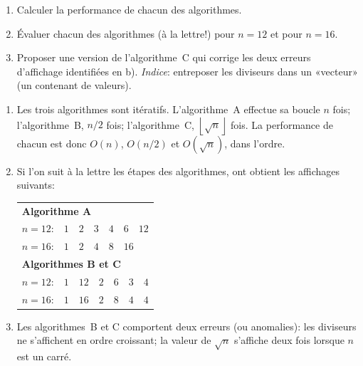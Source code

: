 \begin{exercice}
  \begin{enumerate}
  \item Calculer la performance de chacun des algorithmes.
  \item Évaluer chacun des algorithmes (à la lettre!) pour $n = 12$ et
    pour $n = 16$.
  \item Proposer une version de l'algorithme~C qui corrige les deux
    erreurs d'affichage identifiées en b). \emph{Indice}: entreposer
    les diviseurs dans un «vecteur» (un contenant de valeurs).
  \end{enumerate}
  \begin{sol}
    \begin{enumerate}
    \item Les trois algorithmes sont itératifs. L'algorithme~A
      effectue sa boucle $n$ fois; l'algorithme~B, $n/2$ fois;
      l'algorithme~C, $\left\lfloor \sqrt{n} \right\rfloor$ fois. La
      performance de chacun est donc $O(n)$, $O(n/2)$ et
      $O(\sqrt{n})$, dans l'ordre.
    \item Si l'on suit à la lettre les étapes des algorithmes, ont
      obtient les affichages suivants:
      \begin{center}
        \begin{tabular}{rl}
          \multicolumn{2}{l}{\textbf{Algorithme A}} \\
          $n = 12$: & $1\quad 2\quad 3\quad 4\quad 6\quad 12$ \\
          $n = 16$: & $1\quad 2\quad 4\quad 8\quad 16$ \\[6pt]
          \multicolumn{2}{l}{\textbf{Algorithmes B et C}} \\
          $n = 12$: & $1\quad 12\quad 2\quad 6\quad 3\quad 4$ \\
          $n = 16$: & $1\quad 16\quad 2\quad 8\quad 4\quad 4$ \\[6pt]
        \end{tabular}
      \end{center}
    \item Les algorithmes~B et C comportent deux erreurs (ou
      anomalies): les diviseurs ne s'affichent en ordre croissant; la
      valeur de $\sqrt{n}$ s'affiche deux fois lorsque $n$ est un
      carré.


\end{enumerate}
\end{sol}
\end{exercice}
